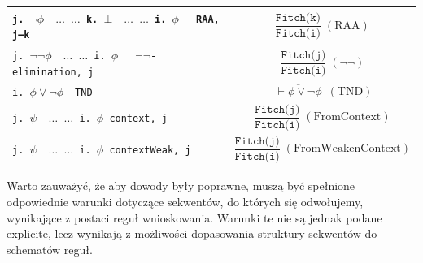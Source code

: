 \documentclass[shortabstract]{iithesis}
\theoremstyle{definition}
\theoremstyle{remark}
\theoremstyle{plain}
\begin{document}
\begin{center}
\begin{longtable}{|p{}|p{}|}
\texttt{j. $\neg \phi \quad  \dots$
     \newline
     $\dots$
     \newline
     k. $ \bot \quad  \dots$
     \newline
     $\dots$
     \newline
     i. $\phi  \quad $ RAA, j–k}

&

$$\displaystyle
\frac{\texttt{Fitch(k)}}{\texttt{Fitch(i)}}\;{(\mathrm{RAA})}
$$

\\
\hline



\texttt{j. $\neg \neg \phi \quad  \dots$
     \newline
     $\dots$
     \newline
     i. $\phi  \quad $ $\neg\neg$-elimination, j}

&

$$\displaystyle
\frac{\texttt{Fitch(j)}}{\texttt{Fitch(i)}}\;{(\neg\neg)}
$$

\\
\hline




\texttt{i. $\phi \lor \neg \phi \quad $TND}
&
$$\displaystyle
\overline{\ \vdash \phi \lor \neg \phi\ }\;{(\mathrm{TND})}$$
\\

\hline


\texttt{j. $\psi \quad \dots$
     \newline
     $\dots$
     \newline
     i. $\phi $ \quad context, j}
&
$$\displaystyle
\frac{\texttt{Fitch(j)}}{\texttt{Fitch(i)}}\;{(\mathrm{FromContext})}
$$
\\

\hline
\texttt{j. $\psi \quad \dots$
     \newline
     $\dots$
     \newline
     i. $\phi $ \quad contextWeak, j}
&
$$\displaystyle
\frac{\texttt{Fitch(j)}}{\texttt{Fitch(i)}}\;{(\mathrm{FromWeakenContext})}
$$
\\

\hline




\end{longtable}
\end{center}

Warto zauważyć, że aby dowody były poprawne, muszą być spełnione odpowiednie warunki
dotyczące sekwentów, do których się odwołujemy, wynikające z postaci reguł wnioskowania.
Warunki te nie są jednak podane explicite, lecz wynikają z możliwości dopasowania
struktury sekwentów do schematów reguł.
\end{document}
